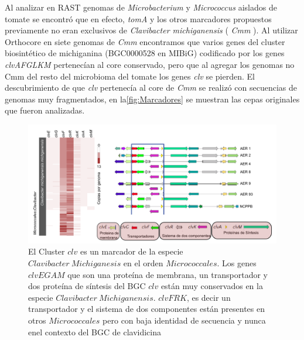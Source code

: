 \documentclass[12pt,twoside]{reedthesis}
\begin{document}
  Al analizar en RAST genomas de \emph{Microbacterium} y
  \emph{Micrococcus} aislados de tomate se encontró que en efecto,
  \emph{tomA} y los otros marcadores propuestos previamente no eran
  exclusivos de \emph{Clavibacter michiganensis} ( \emph{Cmm} ). Al
  utilizar Orthocore en siete genomas de \emph{Cmm} encontramos que varios
  genes del cluster biosintético de michiganina (BGC0000528 en MIBiG)
  codificado por los genes \emph{clvAFGLKM} pertenecían al core
  conservado, pero que al agregar los genomas no Cmm del resto del
  microbioma del tomate los genes \emph{clv} se pierden. El descubrimiento
  de que \emph{clv} pertenecía al core de \emph{Cmm} se realizó con
  secuencias de genomas muy fragmentados, en la\autoref{fig:Marcadores} se
  muestran las cepas originales que fueron analizadas.
  
  \begin{figure}[h!tbp]
  \centering
  \includegraphics[angle = 0,scale = .6]{chapter1/clv.png}
  \caption[ El Cluster $clv$ es un marcador de la especie $Clavibacter~Michiganesis$ en el orden $Micrococcales$.]{\footnotesize{El Cluster $clv$ es un marcador de la especie $Clavibacter~Michiganesis$ en el orden $Micrococcales$. Los genes $clvEGAM$ que son una proteína de membrana, un transportador y dos proteína de síntesis del BGC $clv$ están muy conservados en la especie $Clavibacter~Michiganensis$. $clvFRK$, es decir un transportador y el sistema de dos componentes están presentes en otros $Micrococcales$ pero con baja identidad de secuencia y nunca enel contexto del BGC de clavidicina}}
  \label{fig:clv-Marcadores}
  \end{figure}
  
\end{document}
